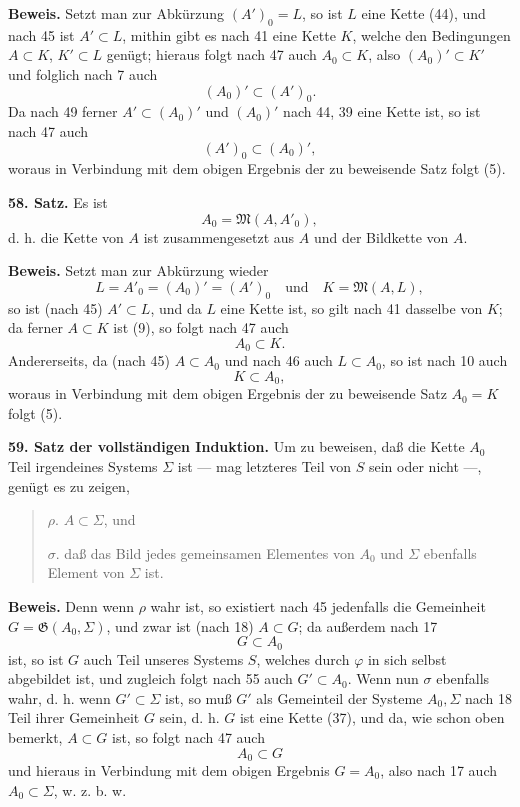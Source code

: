 \documentclass[11pt]{article}
\newcommand{\Mf}{\mathfrak{M}}
\newcommand{\Gf}{\mathfrak{G}}
\newcommand{\partof}{\mathrel{\subset}}
\begin{document}
\textbf{Beweis.} Setzt man zur Abkürzung $(A')_0=L$, so ist $L$ eine Kette (44), und nach 45 ist $A'\partof L$, mithin gibt es nach 41 eine Kette $K$, welche den Bedingungen $A\partof K$, $K'\partof L$ genügt; hieraus folgt nach 47 auch $A_0\partof K$, also $(A_0)'\partof K'$ und folglich nach 7 auch
\[
(A_0)'\partof(A')_0.
\]
Da nach 49 ferner $A'\partof(A_0)'$ und $(A_0)'$ nach 44, 39 eine Kette ist, so ist nach 47 auch
\[
(A')_0\partof(A_0)',
\]
woraus in Verbindung mit dem obigen Ergebnis der zu beweisende Satz folgt (5).

\noindent\textbf{58. Satz.} Es ist
\[
A_0=\Mf(A,A'_0),
\]
d. h. die Kette von $A$ ist zusammengesetzt aus $A$ und der Bildkette von $A$.

\textbf{Beweis.} Setzt man zur Abkürzung wieder
\[
L=A'_0=(A_0)'=(A')_0 \quad\text{und}\quad K=\Mf(A,L),
\]
so ist (nach 45) $A'\partof L$, und da $L$ eine Kette ist, so gilt nach 41 dasselbe von $K$; da ferner $A\partof K$ ist (9), so folgt nach 47 auch
\[
A_0\partof K.
\]
Andererseits, da (nach 45) $A\partof A_0$ und nach 46 auch $L\partof A_0$, so ist nach 10 auch
\[
K\partof A_0,
\]
woraus in Verbindung mit dem obigen Ergebnis der zu beweisende Satz $A_0=K$ folgt (5).

\noindent\textbf{59. Satz der vollständigen Induktion.} Um zu beweisen, daß die Kette $A_0$ Teil irgendeines Systems $\Sigma$ ist — mag letzteres Teil von $S$ sein oder nicht —, genügt es zu zeigen,

\begin{quote}
\(\rho.\) \(A\partof\Sigma\), und

\(\sigma.\) daß das Bild jedes gemeinsamen Elementes von \(A_0\) und \(\Sigma\) ebenfalls Element von \(\Sigma\) ist.
\end{quote}

\textbf{Beweis.} Denn wenn $\rho$ wahr ist, so existiert nach 45 jedenfalls die Gemeinheit $G=\Gf(A_0,\Sigma)$, und zwar ist (nach 18) $A\partof G$; da außerdem nach 17
\[
G\partof A_0
\]
ist, so ist $G$ auch Teil unseres Systems $S$, welches durch $\varphi$ in sich selbst abgebildet ist, und zugleich folgt nach 55 auch $G'\partof A_0$. Wenn nun $\sigma$ ebenfalls wahr, d. h. wenn $G'\partof\Sigma$ ist, so muß $G'$ als Gemeinteil der Systeme $A_0,\Sigma$ nach 18 Teil ihrer Gemeinheit $G$ sein, d. h. $G$ ist eine Kette (37), und da, wie schon oben bemerkt, $A\partof G$ ist, so folgt nach 47 auch
\[
A_0\partof G
\]
und hieraus in Verbindung mit dem obigen Ergebnis $G=A_0$, also nach 17 auch $A_0\partof\Sigma$, w. z. b. w.
\end{document}
